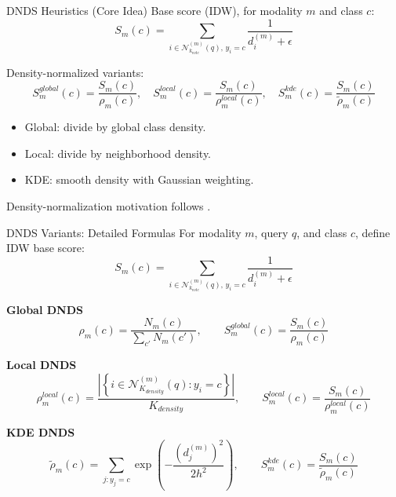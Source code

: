 \documentclass[aspectratio=169]{beamer}
\begin{document}
\begin{frame}{DNDS Heuristics (Core Idea)}
\small
Base score (IDW), for modality $m$ and class $c$:
\[
S_m(c)=\sum_{i\in \mathcal{N}^{(m)}_{k_{vote}}(q),\, y_i=c}\frac{1}{d_i^{(m)}+\epsilon}
\]

Density-normalized variants:
\[
S_m^{global}(c)=\frac{S_m(c)}{\rho_m(c)},\quad
S_m^{local}(c)=\frac{S_m(c)}{\rho_m^{local}(c)},\quad
S_m^{kde}(c)=\frac{S_m(c)}{\tilde\rho_m(c)}
\]

\vspace{-6pt}
\begin{itemize}
  \item Global: divide by global class density.
  \item Local: divide by neighborhood density.
  \item KDE: smooth density with Gaussian weighting.
\end{itemize}
\vspace{2pt}
{\tiny Density-normalization motivation follows \cite{yuan2021novel,amer2025effective,wkeglarczyk2018kernel}.}
\end{frame}

\begin{frame}{DNDS Variants: Detailed Formulas}
\scriptsize
For modality $m$, query $q$, and class $c$, define IDW base score:
\[
S_m(c)=\sum_{i\in\mathcal{N}^{(m)}_{k_{vote}}(q),\,y_i=c}\frac{1}{d_i^{(m)}+\epsilon}
\]

\textbf{Global DNDS}
\[
\rho_m(c)=\frac{N_m(c)}{\sum_{c'}N_m(c')},\qquad
S_m^{global}(c)=\frac{S_m(c)}{\rho_m(c)}
\]

\textbf{Local DNDS}
\[
\rho_m^{local}(c)=\frac{\left|\left\{i\in\mathcal{N}^{(m)}_{K_{density}}(q):y_i=c\right\}\right|}{K_{density}},\qquad
S_m^{local}(c)=\frac{S_m(c)}{\rho_m^{local}(c)}
\]

\textbf{KDE DNDS}
\[
\tilde{\rho}_m(c)=\sum_{j:y_j=c}\exp\!\left(-\frac{\left(d_j^{(m)}\right)^2}{2h^2}\right),\qquad
S_m^{kde}(c)=\frac{S_m(c)}{\tilde{\rho}_m(c)}
\]
\end{frame}
\end{document}
